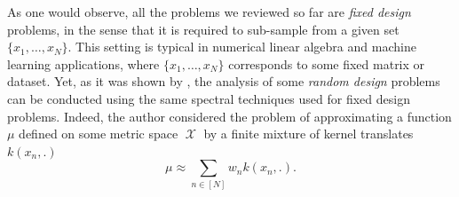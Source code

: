 \documentclass[twoside,11pt]{book}
\numberwithin{theorem}{chapter}
\numberwithin{definition}{chapter}
\numberwithin{proposition}{chapter}
\numberwithin{corollary}{chapter}
\numberwithin{example}{chapter}
\numberwithin{lemma}{chapter}
\numberwithin{assumption}{chapter}
\numberwithin{equation}{chapter}
\numberwithin{figure}{chapter}
\DeclareMathOperator{\X}{\mathcal{X}}
\begin{document}





As one would observe, all the problems we reviewed so far are \emph{fixed design} problems, in the sense that it is required to sub-sample from a given set $\{x_{1}, \dots, x_{N}\}$. This setting is typical in numerical linear algebra and machine learning applications, where $\{x_{1}, \dots, x_{N}\}$ corresponds to some fixed matrix or dataset. Yet, as it was shown by \cite{Bac17}, the analysis of some \emph{random design} problems can be conducted using the same spectral techniques used for fixed design problems. Indeed, the author considered the problem of approximating a function $\mu$ defined on some metric space $\X$ by a finite mixture of kernel translates $k(x_{n},.)$ 
\begin{equation}\label{eq:introduction_f_mixture}
\mu \approx \sum\limits_{n \in [N]}w_{n}k(x_{n},.).
\end{equation}
\end{document}
